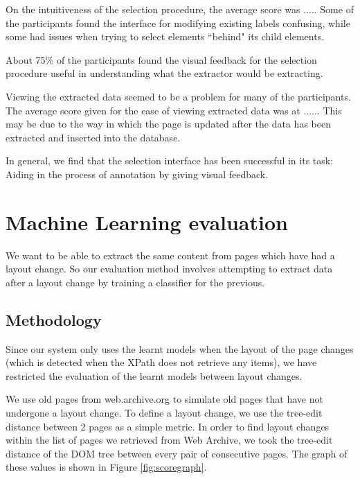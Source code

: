 On the intuitiveness of the selection procedure, the average score was .....
Some of the participants found the interface for modifying existing labels confusing,
while some had issues when trying to select elements ``behind" its child elements.

About 75\% of the participants found the visual feedback for the selection procedure useful
in understanding what the extractor would be extracting. 

Viewing the extracted data seemed to be a problem for many of the participants. The average
score given for the ease of viewing extracted data was at ...... This may be due to the way
in which the page is updated after the data has been extracted and inserted into the database.

In general, we find that the selection interface has been successful in its task: Aiding in 
the process of annotation by giving visual feedback.

\section{Machine Learning evaluation}
 We want to be able to extract the same content from pages which have had a layout change. So our
 evaluation method involves attempting to extract data after a layout change by training a
 classifier for the previous.
\subsection{Methodology}
	Since our system only uses the learnt models when the layout of the page changes (which is 
detected when the XPath does not retrieve any items), we have restricted the evaluation of 
the learnt models between layout changes.

	We use old pages from web.archive.org to simulate old pages that have not
undergone a layout change. To define a layout change, we use the tree-edit distance \cite{Zhang1989} between 2 pages as
a simple metric. In order to find layout changes within the list of pages we retrieved from Web
Archive, we took the tree-edit distance of the DOM tree between every pair of consecutive pages.
The graph of these values is shown in Figure \ref{fig:scoregraph}.

